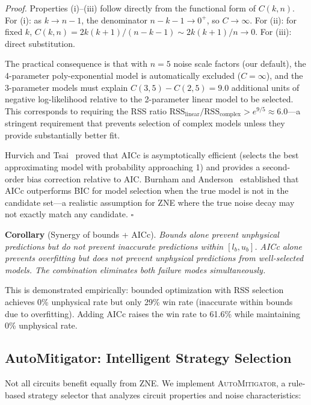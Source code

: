 \textit{Proof.} Properties (i)--(iii) follow directly from the functional form of $C(k,n)$. For (i): as $k \to n-1$, the denominator $n-k-1 \to 0^+$, so $C \to \infty$. For (ii): for fixed $k$, $C(k,n) = 2k(k+1)/(n-k-1) \sim 2k(k+1)/n \to 0$. For (iii): direct substitution.

The practical consequence is that with $n=5$ noise scale factors (our default), the 4-parameter poly-exponential model is automatically excluded ($C = \infty$), and the 3-parameter models must explain $C(3,5) - C(2,5) = 9.0$ additional units of negative log-likelihood relative to the 2-parameter linear model to be selected. This corresponds to requiring the RSS ratio $\text{RSS}_\text{linear}/\text{RSS}_\text{complex} > e^{9/5} \approx 6.0$---a stringent requirement that prevents selection of complex models unless they provide substantially better fit.

Hurvich and Tsai~\cite{Hurvich1989} proved that AICc is asymptotically efficient (selects the best approximating model with probability approaching 1) and provides a second-order bias correction relative to AIC. Burnham and Anderson~\cite{Burnham2002} established that AICc outperforms BIC for model selection when the true model is not in the candidate set---a realistic assumption for ZNE where the true noise decay may not exactly match any candidate. $\square$

\textbf{Corollary} (Synergy of bounds + AICc). \textit{Bounds alone prevent unphysical predictions but do not prevent inaccurate predictions within $[l_b, u_b]$. AICc alone prevents overfitting but does not prevent unphysical predictions from well-selected models. The combination eliminates both failure modes simultaneously.}

This is demonstrated empirically: bounded optimization with RSS selection achieves 0\% unphysical rate but only 29\% win rate (inaccurate within bounds due to overfitting). Adding AICc raises the win rate to 61.6\% while maintaining 0\% unphysical rate.

\subsection{AutoMitigator: Intelligent Strategy Selection}
\label{sec:automitigator}

Not all circuits benefit equally from ZNE. We implement \textsc{AutoMitigator}, a rule-based strategy selector that analyzes circuit properties and noise characteristics:

